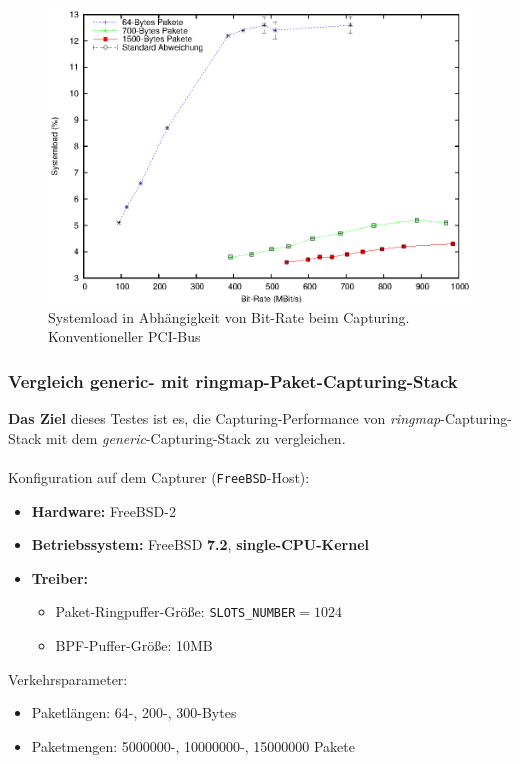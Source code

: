 {\begin{figure} 
\centering \includegraphics[width=5.5in]{plots/graphs/sysload_PCI_mbs.eps}
\caption{Systemload in Abhängigkeit von Bit-Rate beim Capturing. Konventioneller PCI-Bus}
\label{img:plot_sysload_pci_mbs}
\end{figure}
}
\subsubsection{Vergleich generic- mit ringmap-Paket-Capturing-Stack}\label{sec:erg_verg}
\textbf{Das Ziel} dieses Testes ist es, die Capturing-Performance von 
\emph{ringmap}-Capturing-Stack mit dem \emph{generic}-Capturing-Stack
zu vergleichen.\\\\
%
Konfiguration auf dem Capturer (\verb+FreeBSD+-Host): 
\begin{itemize}
	\item \textbf{Hardware:} FreeBSD-2 
	\item \textbf{Betriebssystem:} FreeBSD \textbf{7.2}, \textbf{single-CPU-Kernel}
	\item \textbf{Treiber:} 
		\begin{itemize}
			\item Paket-Ringpuffer-Größe: \verb+SLOTS_NUMBER+$=1024$
			\item BPF-Puffer-Größe: 10MB
		\end{itemize}
\end{itemize}
Verkehrsparameter:
\begin{itemize}
	\item Paketlängen: 64-, 200-, 300-Bytes
	\item Paketmengen: 5000000-, 10000000-, 15000000 Pakete 
\end{itemize}

